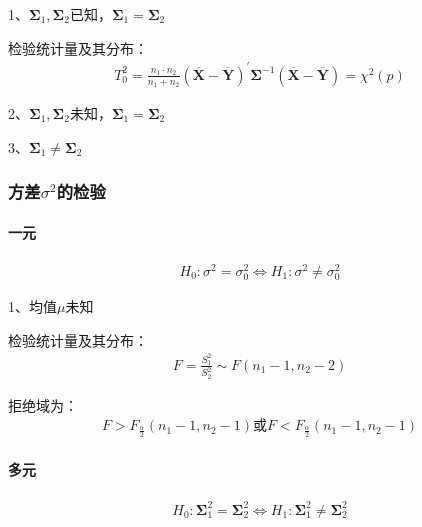 \documentclass[12pt]{book}
\begin{document}
1、$\bm{\Sigma}_1,\bm{\Sigma}_2$已知，$\bm{\Sigma}_1=\bm{\Sigma}_2$

检验统计量及其分布：
\begin{gather*}
    T_0^2 =\frac{n_1\cdot n_2}{n_1+n_2}\left(\overline{\bm{X}}-\overline{\bm{Y}}\right)^\prime\bm{\Sigma}^{-1}\left(\overline{\bm{X}}-\overline{\bm{Y}}\right)=\chi^2\left(p\right)
\end{gather*}

2、$\bm{\Sigma}_1,\bm{\Sigma}_2$未知，$\bm{\Sigma}_1=\bm{\Sigma}_2$

3、$\bm{\Sigma}_1\neq\bm{\Sigma}_2$

\subsubsection{方差$\sigma^2$的检验}

\paragraph{一元}

\begin{gather*}
    H_0:\sigma^2=\sigma_0^2\Leftrightarrow H_1:\sigma^2\neq\sigma_0^2
\end{gather*}


1、均值$\mu$未知

检验统计量及其分布：
\begin{gather*}
    F=\frac{S_1^2}{S_2^2}\sim F(n_1-1,n_2-2)
\end{gather*}


拒绝域为：
\begin{gather*}
    F>F_{\frac{\alpha}{2}}(n_1-1,n_2-1)
    \text{或}
    F<F_{\frac{\alpha}{2}}(n_1-1,n_2-1)
\end{gather*}


\paragraph{多元}

\begin{gather*}
    H_0:\bm{\Sigma}_1^2=\bm{\Sigma}_2^2	\Leftrightarrow H_1:\bm{\Sigma}_1^2\neq\bm{\Sigma}_2^2
\end{gather*}
\end{document}
